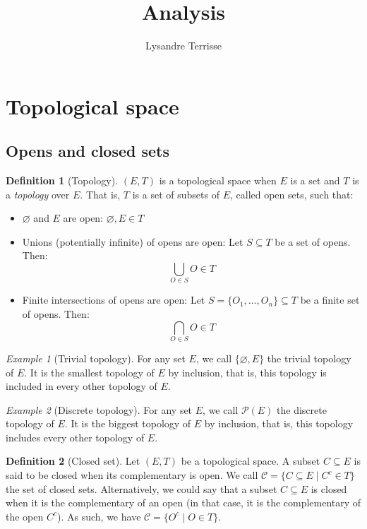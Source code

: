 \documentclass{article}
\title{Analysis}
\author{Lysandre Terrisse}
\theoremstyle{definition}
\newtheorem{definition}{Definition}[section]
\theoremstyle{remark}
\theoremstyle{example}
\newtheorem{example}{Example}[section]
\theoremstyle{notation}
\newcommand{\closed}{\mathcal{C}}
\begin{document}
\maketitle

\section{Topological space}

\subsection{Opens and closed sets}

\begin{definition}[Topology]
		$(E, T)$ is a topological space when $E$ is a set and $T$ is a \textit{topology} over $E$. That is, $T$ is a set of subsets of $E$, called open sets, such that:
		\begin{itemize}
				\item $\varnothing$ and $E$ are open: $\varnothing, E \in T$
				\item Unions (potentially infinite) of opens are open: Let $S \subseteq T$ be a set of opens. Then:
						$$\bigcup_{O \in S} O \in T$$
				\item Finite intersections of opens are open: Let $S = \{O_1, \dots, O_n\} \subseteq T$ be a finite set of opens. Then:
						$$\bigcap_{O \in S} O \in T$$
		\end{itemize}
\end{definition}

\begin{example}[Trivial topology]
		For any set $E$, we call $\{\varnothing, E\}$ the trivial topology of $E$. It is the smallest topology of $E$ by inclusion, that is, this topology is included in every other topology of $E$.
\end{example}

\begin{example}[Discrete topology]
		For any set $E$, we call $\mathcal{P}(E)$ the discrete topology of $E$. It is the biggest topology of $E$ by inclusion, that is, this topology includes every other topology of $E$.
\end{example}

\begin{definition}[Closed set]
		Let $(E, T)$ be a topological space. A subset $C \subseteq E$ is said to be closed when its complementary is open. We call $\closed = \{C \subseteq E \mid C^c \in T\}$ the set of closed sets. Alternatively, we could say that a subset $C \subseteq E$ is closed when it is the complementary of an open (in that case, it is the complementary of the open $C^c$). As such, we have $\closed = \{O^c \mid O \in T\}$.
\end{definition}
\end{document}
